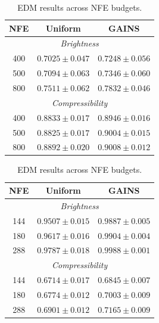 \begin{table}[t]
\centering
\begin{minipage}{0.49\linewidth}
\centering
\caption{SD results across NFE budgets.}
\label{tab:sd_budget}
\small
\begin{tabular}{c|c|c}
\toprule
\textbf{NFE} & \textbf{Uniform} & \textbf{GAINS} \\
\midrule
\multicolumn{3}{c}{\textit{Brightness}} \\
\midrule
400 & $0.7025\!\pm\!0.047$ & $\mathbf{0.7248\!\pm\!0.056}$ \\
500 & $0.7094\!\pm\!0.063$ & $\mathbf{0.7346\!\pm\!0.060}$ \\
800 & $0.7511\!\pm\!0.062$ & $\mathbf{0.7832\!\pm\!0.046}$ \\
\midrule
\multicolumn{3}{c}{\textit{Compressibility}} \\
\midrule
400 & $0.8833\!\pm\!0.017$ & $\mathbf{0.8946\!\pm\!0.016}$ \\
500 & $0.8825\!\pm\!0.017$ & $\mathbf{0.9004\!\pm\!0.015}$ \\
800 & $0.8892\!\pm\!0.020$ & $\mathbf{0.9008\!\pm\!0.012}$ \\
\bottomrule
\end{tabular}
\end{minipage}
\hfill
\begin{minipage}{0.49\linewidth}
\centering
\caption{EDM results across NFE budgets.}
\label{tab:edm_budget}
\small
\begin{tabular}{c|c|c}
\toprule
\textbf{NFE} & \textbf{Uniform} & \textbf{GAINS} \\
\midrule
\multicolumn{3}{c}{\textit{Brightness}} \\
\midrule
144 & $0.9507\!\pm\!0.015$ & $\mathbf{0.9887\!\pm\!0.005}$ \\
180 & $0.9617\!\pm\!0.016$ & $\mathbf{0.9904\!\pm\!0.004}$ \\
288 & $0.9787\!\pm\!0.018$ & $\mathbf{0.9988\!\pm\!0.001}$ \\
\midrule
\multicolumn{3}{c}{\textit{Compressibility}} \\
\midrule
144 & $0.6714\!\pm\!0.017$ & $\mathbf{0.6845\!\pm\!0.007}$ \\
180 & $0.6774\!\pm\!0.012$ & $\mathbf{0.7003\!\pm\!0.009}$ \\
288 & $0.6901\!\pm\!0.012$ & $\mathbf{0.7165\!\pm\!0.009}$ \\
\bottomrule
\end{tabular}
\end{minipage}
\end{table}

